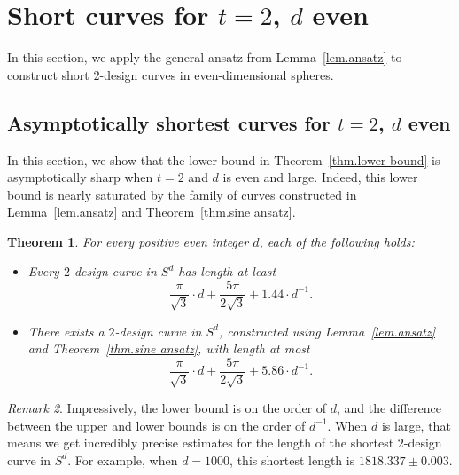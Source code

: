\documentclass[12pt]{article}
\theoremstyle{plain}
\newtheorem{thm}{Theorem}
\theoremstyle{definition}
\theoremstyle{remark}
\newtheorem{rem}[thm]{Remark}
\begin{document}
\section{Short curves for $t=2$, $d$ even}\label{sec:short2}

In this section, we apply the general ansatz from Lemma~\ref{lem.ansatz} to construct short $2$-design curves in even-dimensional spheres.

\subsection{Asymptotically shortest curves for $t=2$, $d$ even}

In this section, we show that the lower bound in Theorem~\ref{thm.lower bound} is asymptotically sharp when $t=2$ and $d$ is even and large.
Indeed, this lower bound is nearly saturated by the family of curves constructed in Lemma~\ref{lem.ansatz} and Theorem~\ref{thm.sine ansatz}.


\begin{thm}
\label{thm.asymptotically shortest}
For every positive even integer $d$, each of the following holds:
\begin{itemize}
\item[(a)]
Every $2$-design curve in $S^d$ has length at least
\[
\frac{\pi}{\sqrt{3}}\cdot d
+\frac{5\pi}{2\sqrt{3}}
+1.44\cdot d^{-1}.
\]
\item[(b)]
There exists a $2$-design curve in $S^d$, constructed using
Lemma~\ref{lem.ansatz} and Theorem~\ref{thm.sine ansatz}, 
with length at most
\[
\frac{\pi}{\sqrt{3}}\cdot d
+\frac{5\pi}{2\sqrt{3}}
+5.86\cdot d^{-1}.
\]
\end{itemize}
\end{thm}

\begin{rem}
Impressively, the lower bound is on the order of $d$, and the difference between the upper and lower bounds is on the order of $d^{-1}$.
When $d$ is large, that means we get incredibly precise estimates for the length of the shortest $2$-design curve in $S^d$.
For example, when $d=1000$, this shortest length is $1818.337\pm0.003$.
\end{rem}
\end{document}
